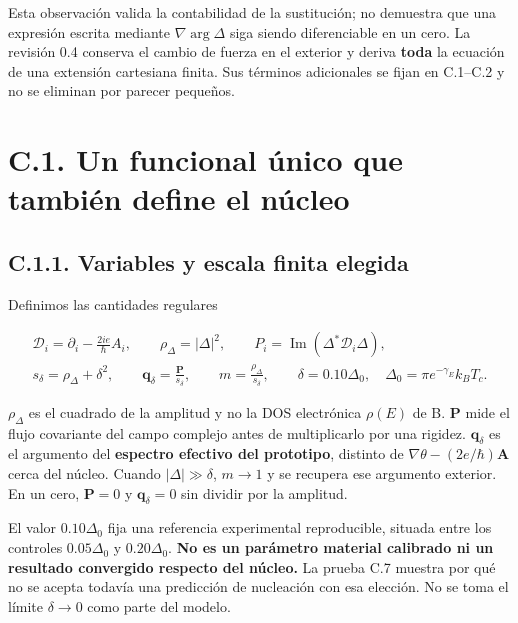 \documentclass[
  spanish,
  10pt,
  a4paper,
]{article}
\begin{document}
Esta observación valida la contabilidad de la sustitución; no demuestra
que una expresión escrita mediante \(\nabla\arg\Delta\) siga siendo
diferenciable en un cero. La revisión 0.4 conserva el cambio de fuerza
en el exterior y deriva \textbf{toda} la ecuación de una extensión
cartesiana finita. Sus términos adicionales se fijan en C.1--C.2 y no se
eliminan por parecer pequeños.

\section{C.1. Un funcional único que también define el
núcleo}\label{c.1.-un-funcional-uxfanico-que-tambiuxe9n-define-el-nuxfacleo}

\subsection{C.1.1. Variables y escala finita
elegida}\label{c.1.1.-variables-y-escala-finita-elegida}

Definimos las cantidades regulares

\[
\begin{gathered}
\mathcal D_i=\partial_i-\frac{2ie}{\hbar}A_i,\qquad
\rho_\Delta=|\Delta|^2,\qquad
P_i=\operatorname{Im}(\Delta^*\mathcal D_i\Delta),\\
s_\delta=\rho_\Delta+\delta^2,\qquad
\mathbf q_\delta=\frac{\mathbf P}{s_\delta},\qquad
m=\frac{\rho_\Delta}{s_\delta},\qquad
\delta=0.10\Delta_0,\quad\Delta_0=\pi e^{-\gamma_E}k_BT_c.
\end{gathered}\tag{C.8}
\]

\(\rho_\Delta\) es el cuadrado de la amplitud y no la DOS electrónica
\(\rho(E)\) de B. \(\mathbf P\) mide el flujo covariante del campo
complejo antes de multiplicarlo por una rigidez. \(\mathbf q_\delta\) es
el argumento del \textbf{espectro efectivo del prototipo}, distinto de
\(\nabla\theta-(2e/\hbar)\mathbf A\) cerca del núcleo. Cuando
\(|\Delta|\gg\delta\), \(m\to1\) y se recupera ese argumento exterior.
En un cero, \(\mathbf P=0\) y \(\mathbf q_\delta=0\) sin dividir por la
amplitud.

El valor \(0.10\Delta_0\) fija una referencia experimental reproducible,
situada entre los controles \(0.05\Delta_0\) y \(0.20\Delta_0\).
\textbf{No es un parámetro material calibrado ni un resultado convergido
respecto del núcleo.} La prueba C.7 muestra por qué no se acepta todavía
una predicción de nucleación con esa elección. No se toma el límite
\(\delta\to0\) como parte del modelo.
\end{document}
